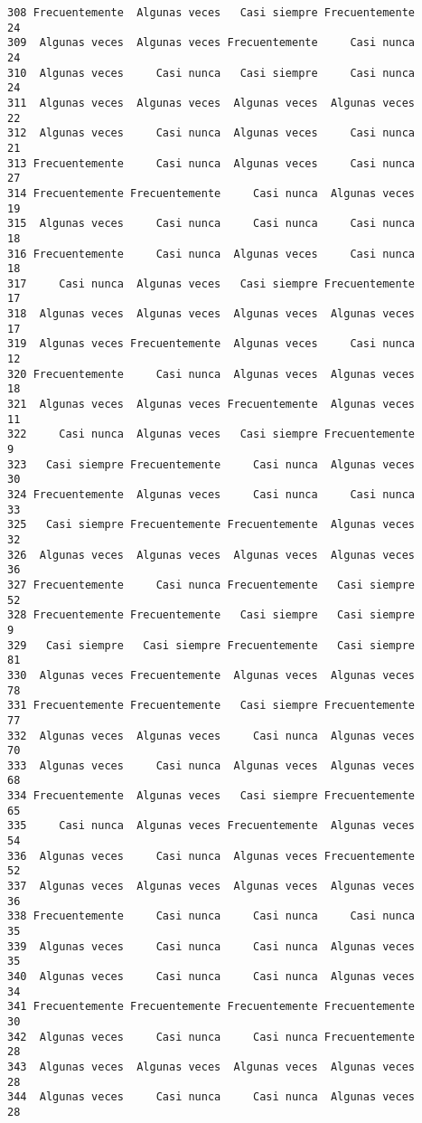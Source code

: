 \documentclass[
  letterpaper,
  DIV=11,
  numbers=noendperiod]{scrartcl}
\begin{document}
\begin{verbatim}
308 Frecuentemente  Algunas veces   Casi siempre Frecuentemente      24
309  Algunas veces  Algunas veces Frecuentemente     Casi nunca      24
310  Algunas veces     Casi nunca   Casi siempre     Casi nunca      24
311  Algunas veces  Algunas veces  Algunas veces  Algunas veces      22
312  Algunas veces     Casi nunca  Algunas veces     Casi nunca      21
313 Frecuentemente     Casi nunca  Algunas veces     Casi nunca      27
314 Frecuentemente Frecuentemente     Casi nunca  Algunas veces      19
315  Algunas veces     Casi nunca     Casi nunca     Casi nunca      18
316 Frecuentemente     Casi nunca  Algunas veces     Casi nunca      18
317     Casi nunca  Algunas veces   Casi siempre Frecuentemente      17
318  Algunas veces  Algunas veces  Algunas veces  Algunas veces      17
319  Algunas veces Frecuentemente  Algunas veces     Casi nunca      12
320 Frecuentemente     Casi nunca  Algunas veces  Algunas veces      18
321  Algunas veces  Algunas veces Frecuentemente  Algunas veces      11
322     Casi nunca  Algunas veces   Casi siempre Frecuentemente       9
323   Casi siempre Frecuentemente     Casi nunca  Algunas veces      30
324 Frecuentemente  Algunas veces     Casi nunca     Casi nunca      33
325   Casi siempre Frecuentemente Frecuentemente  Algunas veces      32
326  Algunas veces  Algunas veces  Algunas veces  Algunas veces      36
327 Frecuentemente     Casi nunca Frecuentemente   Casi siempre      52
328 Frecuentemente Frecuentemente   Casi siempre   Casi siempre       9
329   Casi siempre   Casi siempre Frecuentemente   Casi siempre      81
330  Algunas veces Frecuentemente  Algunas veces  Algunas veces      78
331 Frecuentemente Frecuentemente   Casi siempre Frecuentemente      77
332  Algunas veces  Algunas veces     Casi nunca  Algunas veces      70
333  Algunas veces     Casi nunca  Algunas veces  Algunas veces      68
334 Frecuentemente  Algunas veces   Casi siempre Frecuentemente      65
335     Casi nunca  Algunas veces Frecuentemente  Algunas veces      54
336  Algunas veces     Casi nunca  Algunas veces Frecuentemente      52
337  Algunas veces  Algunas veces  Algunas veces  Algunas veces      36
338 Frecuentemente     Casi nunca     Casi nunca     Casi nunca      35
339  Algunas veces     Casi nunca     Casi nunca  Algunas veces      35
340  Algunas veces     Casi nunca     Casi nunca  Algunas veces      34
341 Frecuentemente Frecuentemente Frecuentemente Frecuentemente      30
342  Algunas veces     Casi nunca     Casi nunca Frecuentemente      28
343  Algunas veces  Algunas veces  Algunas veces  Algunas veces      28
344  Algunas veces     Casi nunca     Casi nunca  Algunas veces      28

\end{verbatim}
\end{document}
